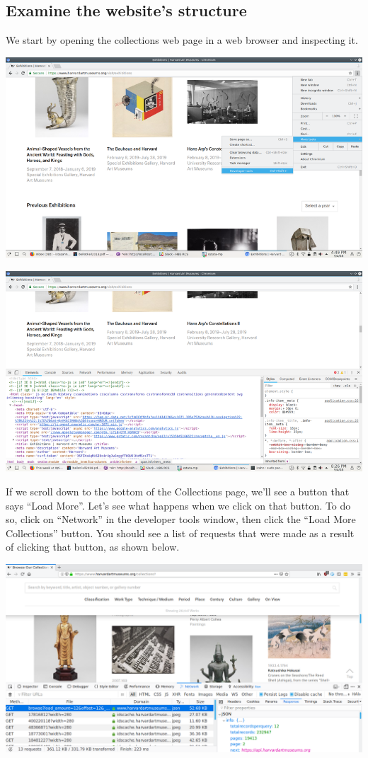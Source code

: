 \documentclass[
]{book}
\begin{document}
\hypertarget{examine-the-websites-structure}{%
\subsection{Examine the website's structure}\label{examine-the-websites-structure}}

We start by opening the collections web page in a web browser and
inspecting it.

\includegraphics{Python/PythonWebScrape/images/dev_tools.png}

\includegraphics{Python/PythonWebScrape/images/dev_tools_pane.png}

If we scroll down to the bottom of the Collections page, we'll see a
button that says ``Load More''. Let's see what happens when we click on
that button. To do so, click on ``Network'' in the developer tools
window, then click the ``Load More Collections'' button. You should see
a list of requests that were made as a result of clicking that button,
as shown below.

\includegraphics{Python/PythonWebScrape/images/dev_tools_network.png}
\end{document}
